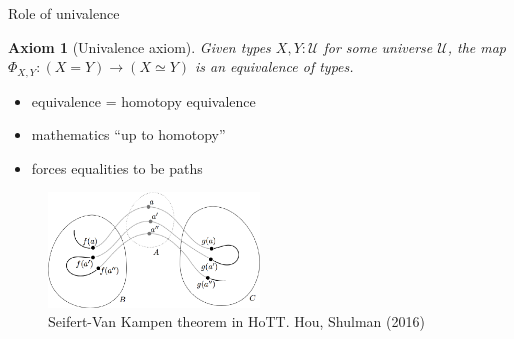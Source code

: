 \documentclass[english,draft]{beamer}
\newtheorem{axiom}[theorem]{Axiom}
\begin{document}





\begin{frame}{Role of univalence}

\begin{axiom}[Univalence axiom] 
 Given types $X,Y : \mathcal{U}$ for some universe $\mathcal{U}$, the map \(\Phi_{X,Y}: (X=Y) \rightarrow (X \simeq Y)\) is an equivalence of types. 
\end{axiom}

\begin{itemize}
 \item equivalence = homotopy equivalence
 \item mathematics ``up to homotopy''
 \item forces equalities to be paths
\end{itemize}
 


\begin{figure}[h!]
\centering    
\includegraphics[width=0.5\textwidth]{figures/seifert.png}
  \caption{Seifert-Van Kampen theorem in HoTT. Hou, Shulman (2016)}
 \end{figure} 




\end{frame}
\end{document}
